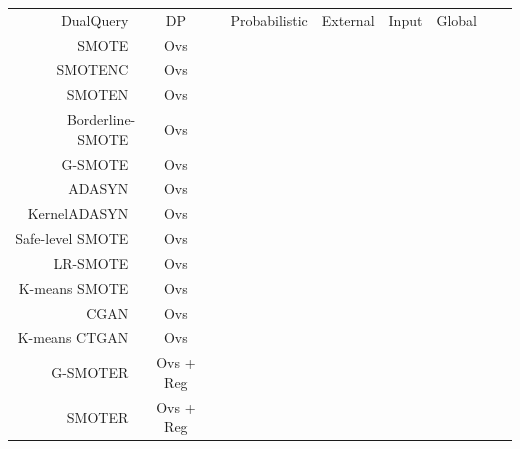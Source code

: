\documentclass[parskip=full]{scrartcl}
\begin{document}
\begin{longtable}{rcccccccc}
      DualQuery~\cite{gaboardi2014dual} & DP &  & Probabilistic & External & Input & Global \\
      SMOTE~\cite{chawla2002smote} & Ovs \\
      SMOTENC~\cite{chawla2002smote} & Ovs \\
      SMOTEN~\cite{chawla2002smote} & Ovs \\
      Borderline-SMOTE~\cite{han2005borderline} & Ovs \\
      G-SMOTE~\cite{douzas2019geometric} & Ovs \\
      ADASYN~\cite{he2008adasyn} & Ovs \\
      KernelADASYN~\cite{tang2015kerneladasyn} & Ovs \\
      Safe-level SMOTE~\cite{bunkhumpornpat2009safe} & Ovs \\
      LR-SMOTE~\cite{liang2020lr} & Ovs \\
      K-means SMOTE~\cite{douzas2018improving} & Ovs \\
      CGAN~\cite{douzas2018effective} & Ovs \\
      K-means CTGAN~\cite{an2021k} & Ovs \\
      G-SMOTER~\cite{camacho2022geometric} & Ovs + Reg \\
      SMOTER~\cite{torgo2013smote} & Ovs + Reg \\
\end{longtable}
\endgroup


% 
% 
% 
\end{document}
